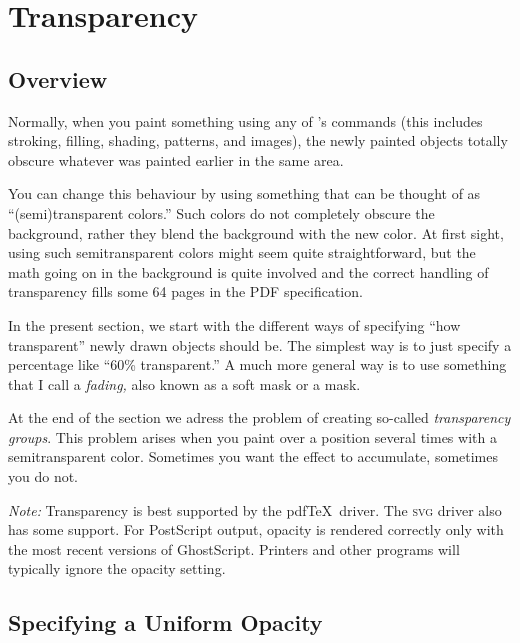 %
%
%


\section{Transparency}

\label{section-tikz-transparency}


\subsection{Overview}

Normally, when you paint something using any of \tikzname's commands
(this includes stroking, filling, shading, patterns, and images), the
newly painted objects totally obscure whatever was painted earlier in
the same area.

You can change this behaviour by using something that can be thought
of as ``(semi)transparent colors.'' Such colors do not completely
obscure the background, rather they blend the background with the new
color. At first sight, using such semitransparent colors might seem quite
straightforward, but the math going on in the background is quite
involved and the correct handling of transparency fills some 64 pages
in the PDF specification. 

In the present section, we start with the different ways of specifying
``how transparent'' newly drawn objects should be. The simplest way is
to just specify a percentage like ``60\% transparent.'' A much more
general way is to use something that I call a \emph{fading,} also
known as a soft mask or a mask.

At the end of the section we adress the problem of creating so-called
\emph{transparency groups}. This problem arises when you paint over a
position several times with a semitransparent color. Sometimes you
want the effect to accumulate, sometimes you do not.

\emph{Note:} Transparency is best supported by the pdf\TeX\
driver. The \textsc{svg} driver also has some support. For PostScript
output, opacity is rendered correctly only with the most recent
versions of GhostScript. Printers and other programs will typically
ignore the opacity setting. 



\subsection{Specifying a Uniform Opacity}

